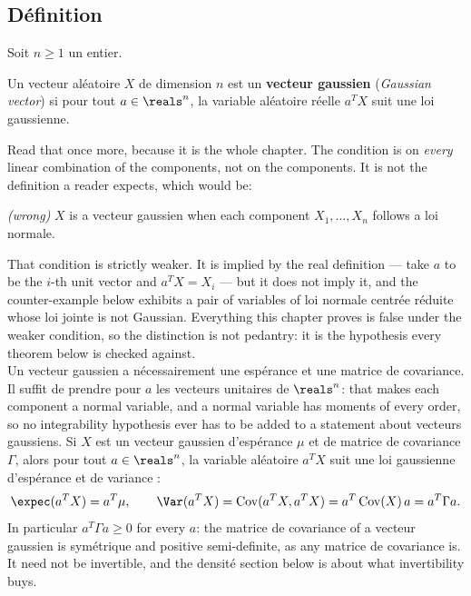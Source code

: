 \subsection{Définition}

Soit $n \geq 1$ un entier.

\begin{definition}
Un vecteur aléatoire $X$ de dimension $n$ est un \textbf{vecteur gaussien}
(\textit{Gaussian vector}) si pour tout $a \in \reals^{n}$, la variable
aléatoire réelle $a^{T}X$ suit une loi gaussienne.
\end{definition}

Read that once more, because it is the whole chapter. The condition is on
\emph{every} linear combination of the components, not on the components. It is
not the definition a reader expects, which would be:

\begin{center}
\emph{(wrong)} $X$ is a vecteur gaussien when each component $X_{1},\dots,X_{n}$
follows a loi normale.
\end{center}

That condition is strictly weaker. It is implied by the real definition --- take
$a$ to be the $i$-th unit vector and $a^{T}X = X_{i}$ --- but it does not imply
it, and the counter-example below exhibits a pair of variables of loi normale
centrée réduite whose loi jointe is not Gaussian. Everything this chapter proves
is false under the weaker condition, so the distinction is not pedantry: it is
the hypothesis every theorem below is checked against.\\

Un vecteur gaussien a nécessairement une espérance et une matrice de covariance.
Il suffit de prendre pour $a$ les vecteurs unitaires de $\reals^{n}$: that makes
each component a normal variable, and a normal variable has moments of every
order, so no integrability hypothesis ever has to be added to a statement about
vecteurs gaussiens. Si $X$ est un vecteur gaussien d'espérance $\mu$ et de
matrice de covariance $\Gamma$, alors pour tout $a \in \reals^{n}$, la variable
aléatoire $a^{T}X$ suit une loi gaussienne d'espérance et de variance :
\[
  \expec(a^{T}X) = a^{T}\mu, \qquad
  \Var(a^{T}X) = \Cov(a^{T}X, a^{T}X) = a^{T}\Cov(X)\,a = a^{T}\Gamma a .
\]
In particular $a^{T}\Gamma a \geq 0$ for every $a$: the matrice de covariance of
a vecteur gaussien is symétrique and positive semi-definite, as any matrice de
covariance is. It need not be invertible, and the densité section below is about
what invertibility buys.

